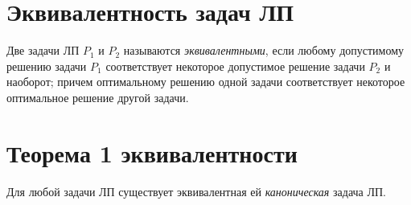 \section{Эквивалентность задач ЛП}

\begin{definition}
	Две задачи ЛП $P_1$ и $P_2$ называются \emph{эквивалентными}, если любому допустимому решению задачи $P_1$ соответствует некоторое допустимое решение задачи $P_2$ и наоборот; причем оптимальному решению одной задачи соответствует некоторое оптимальное решение другой задачи.
\end{definition}

\section{Теорема 1 эквивалентности}

\begin{theorem}
	Для любой задачи ЛП существует эквивалентная ей \emph{каноническая} задача ЛП.
\end{theorem}

